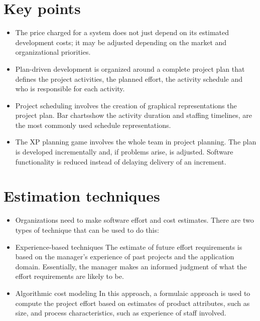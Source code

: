 \section{Key points}
\begin{itemize}

\item The price charged for a system does not just depend on its estimated development costs; it may be adjusted depending on the market and organizational priorities.

\item Plan-driven development is organized around a complete project plan that defines the project activities, the planned effort, the activity schedule and who is responsible for each activity.

\item Project scheduling involves the creation of graphical representations the project plan. Bar chartsshow the activity duration and staffing timelines, are the most commonly used schedule representations.

\item The XP planning game involves the whole team in project planning. The plan is developed incrementally and, if problems arise, is adjusted. Software functionality is reduced instead of delaying delivery of an increment.

\end{itemize}
\section{Estimation techniques}
\begin{itemize}

\item Organizations need to make software effort and cost estimates. There are two types of technique that can be used to do this:

  \item Experience-based techniques The estimate of future effort requirements is based on the manager’s experience of past projects and the application domain. Essentially, the manager makes an informed judgment of what the effort requirements are likely to be.
  \item Algorithmic cost modeling In this approach, a formulaic approach is used to compute the project effort based on estimates of product attributes, such as size, and process characteristics, such as experience of staff involved.
\end{itemize}
